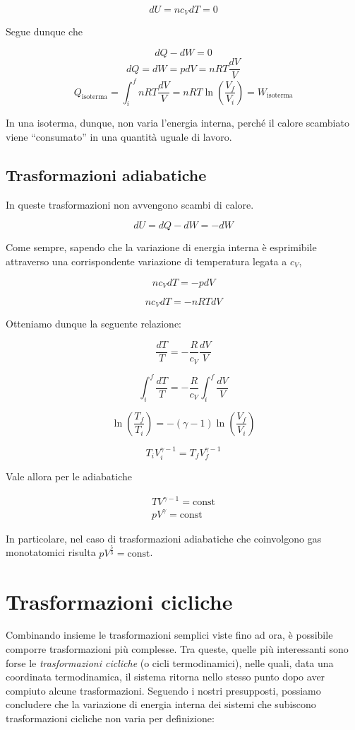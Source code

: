 \[ dU = nc_VdT = 0 \]

Segue dunque che

\[ dQ - dW = 0 \]
\[ dQ = dW = pdV = nRT\frac{dV}{V} \]
\[ Q_\text{isoterma} = \int_{i}^{f}nRT\frac{dV}{V} = nRT\ln\left(\frac{V_f}{V_i}\right) = W_\text{isoterma} \]

In una isoterma, dunque, non varia l'energia interna, perché il calore
scambiato viene ``consumato'' in una quantità uguale di lavoro.

\subsection*{Trasformazioni adiabatiche}
In queste trasformazioni non avvengono scambi di calore.

\[ dU = dQ - dW = -dW \]

Come sempre, sapendo che la variazione di energia interna è esprimibile
attraverso una corrispondente variazione di temperatura legata a $c_V$,

\[ nc_VdT = -pdV \]

\[ nc_VdT = -nRTdV \]

Otteniamo dunque la seguente relazione:

\[ \frac{dT}{T} = -\frac{R}{c_V}\frac{dV}{V} \]

\[ \int_{i}^{f}\frac{dT}{T} = -\frac{R}{c_V}\int_{i}^{f}\frac{dV}{V} \]

\[ \ln\left( \frac{T_f}{T_i} \right) = -(\gamma - 1)\ln\left(\frac{V_f}{V_i}\right) \]

\[ T_i V_i^{\gamma - 1} = T_fV_f^{\gamma - 1} \]

Vale allora per le adiabatiche

\begin{align}
    TV^{\gamma - 1} = \text{const}\\
    pV^\gamma = \text{const}
\end{align}

In particolare, nel caso di trasformazioni adiabatiche che coinvolgono
gas monotatomici risulta $pV^{\frac53} = \text{const}$.

\section*{Trasformazioni cicliche}
Combinando insieme le trasformazioni semplici viste fino ad ora, è possibile
comporre trasformazioni più complesse. Tra queste, quelle più interessanti
sono forse le \textit{trasformazioni cicliche} (o cicli termodinamici), nelle
quali, data una coordinata termodinamica, il sistema ritorna nello stesso
punto dopo aver compiuto alcune trasformazioni. Seguendo i nostri presupposti,
possiamo concludere che la variazione di energia interna dei sistemi che
subiscono trasformazioni cicliche non varia per definizione:

